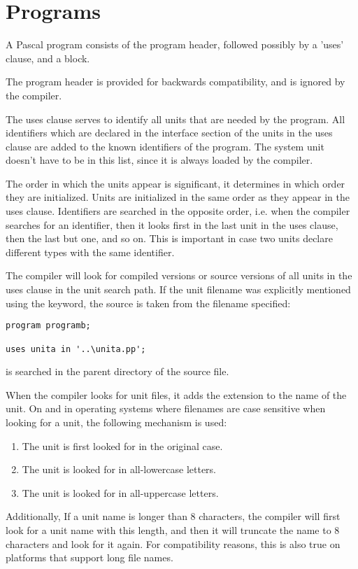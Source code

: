 \section{Programs}
A Pascal program consists of the program header, followed possibly by a
'uses' clause, and a block.

The program header is provided for backwards compatibility, and is ignored
by the compiler.

The uses clause serves to identify all units that are needed by the program.
All identifiers which are declared in the interface section of the units
in the uses clause are added to the known identifiers of the program.
The system unit doesn't have to be in this list, since it is always loaded
by the compiler.

The order in which the units appear is significant, it determines in
which order they are initialized. Units are initialized in the same order
as they appear in the uses clause. Identifiers are searched in the opposite
order, i.e. when the compiler searches for an identifier, then it looks
first in the last unit in the uses clause, then the last but one, and so on.
This is important in case two units declare different types with the same
identifier.

The compiler will look for compiled versions or source versions of all 
units in the uses clause in the unit search path. If the unit filename was
explicitly mentioned using the  keyword, the source is taken from
the filename specified:
\begin{verbatim}
program programb;

uses unita in '..\unita.pp';
\end{verbatim}
 is searched in the parent directory of the  source
file.


When the compiler looks for unit files, it adds the extension 
to the name of the unit. On \linux and in operating systems where filenames 
are case sensitive  when looking for a unit, the following mechanism is
used:
\begin{enumerate}
\item The unit is first looked for in the original case.
\item The unit is looked for in all-lowercase letters.
\item The unit is looked for in all-uppercase letters.
\end{enumerate}
Additionally, If a unit name is longer than 8 characters, the compiler 
will first look for a unit name with this length, and then it will 
truncate the name to 8 characters and look for it again. 
For compatibility reasons, this is also true on platforms that 
support long file names.

